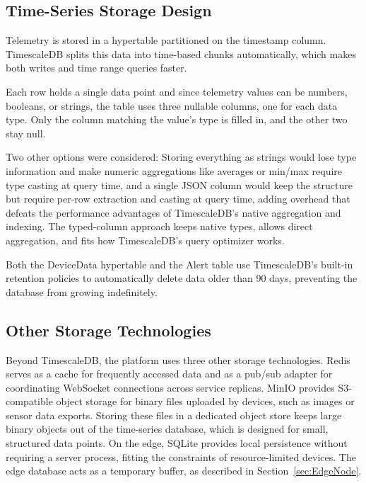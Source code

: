 \subsection{Time-Series Storage Design}
Telemetry is stored in a hypertable partitioned on the timestamp column. TimescaleDB splits this data into time-based chunks automatically, which makes both writes and time range queries faster.

Each row holds a single data point and since telemetry values can be numbers, booleans, or strings, the table uses three nullable columns, one for each data type. Only the column matching the value's type is filled in, and the other two stay null.

Two other options were considered: Storing everything as strings would lose type information and make numeric aggregations like averages or min/max require type casting at query time, and a single \gls{JSON} column would keep the structure but require per-row extraction and casting at query time, adding overhead that defeats the performance advantages of TimescaleDB's native aggregation and indexing. The typed-column approach keeps native types, allows direct aggregation, and fits how TimescaleDB's query optimizer works.

Both the DeviceData hypertable and the Alert table use TimescaleDB's built-in retention policies to automatically delete data older than 90 days, preventing the database from growing indefinitely.

\subsection{Other Storage Technologies}
Beyond TimescaleDB, the platform uses three other storage technologies. Redis serves as a cache for frequently accessed data and as a pub/sub adapter for coordinating WebSocket connections across service replicas. MinIO provides S3-compatible object storage for binary files uploaded by devices, such as images or sensor data exports. Storing these files in a dedicated object store keeps large binary objects out of the time-series database, which is designed for small, structured data points. On the edge, SQLite provides local persistence without requiring a server process, fitting the constraints of resource-limited devices. The edge database acts as a temporary buffer, as described in Section~\ref{sec:EdgeNode}.

